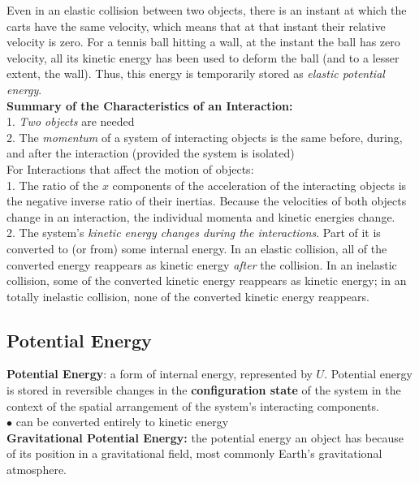         Even in an elastic collision between two objects, there is an instant at which the carts have the same velocity, which means that at that instant their relative velocity is zero. For a tennis ball hitting a wall,
        at the instant the ball has zero velocity, all its kinetic energy has been used to deform the ball (and to a lesser extent, the wall). Thus, this energy is temporarily stored as \textit{elastic potential energy}.
        \\

        \textbf{Summary of the Characteristics of an Interaction:} \\
        1. \textit{Two objects} are needed \\
        2. The \textit{momentum} of a system of interacting objects is the same before, during, and after the interaction (provided the system is isolated) \\
        For Interactions that affect the motion of objects: \\

        1. The ratio of the $x$ components of the acceleration of the interacting objects is the negative inverse ratio of their inertias. Because the velocities of both objects change in an interaction, the individual
        momenta and kinetic energies change. \\
        2. The system's \textit{kinetic energy changes during the interactions}. Part of it is converted to (or from) some internal energy. In an elastic collision, all of the converted energy reappears as kinetic energy
        \textit{after} the collision. In an inelastic collision, some of the converted kinetic energy reappears as kinetic energy; in an totally inelastic collision, none of the converted kinetic energy reappears.


    \pagebreak
    \subsection{Potential Energy}

        \textbf{Potential Energy}: a form of internal energy, represented by $U$. Potential energy is stored in reversible changes in the \textbf{configuration state} of the system in the context of the spatial
        arrangement of the system's interacting components. \\
        $\bullet$ can be converted entirely to kinetic energy \\

        \textbf{Gravitational Potential Energy:} the potential energy an object has because of its position in a gravitational field, most commonly Earth's
        gravitational atmosphere.


